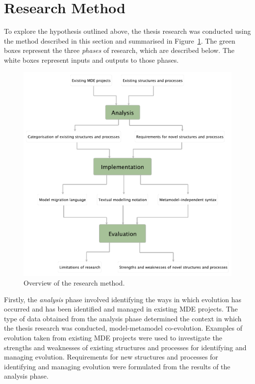 
\section{Research Method}
\label{sec:research_method}
To explore the hypothesis outlined above, the thesis research was conducted using the method described in this section and summarised in Figure~\ref{fig:research_method}. The green boxes represent the three \emph{phases} of research, which are described below. The white boxes represent inputs and outputs to those phases.



\begin{figure}[htbp]
  \begin{center}
    \leavevmode
    \includegraphics[width=12cm]{1.Introduction/images/method.pdf}
  \end{center}
  \caption{Overview of the research method.}
  \label{fig:research_method}
\end{figure}


Firstly, the \emph{analysis} phase involved identifying the ways in which evolution has occurred and has been identified and managed in existing MDE projects. The type of data obtained from the analysis phase determined the context in which the thesis research was conducted, model-metamodel co-evolution. Examples of evolution taken from existing MDE projects were used to investigate the strengths and weaknesses of existing structures and processes for identifying and managing evolution. Requirements for new structures and processes for identifying and managing evolution were formulated from the results of the analysis phase.

